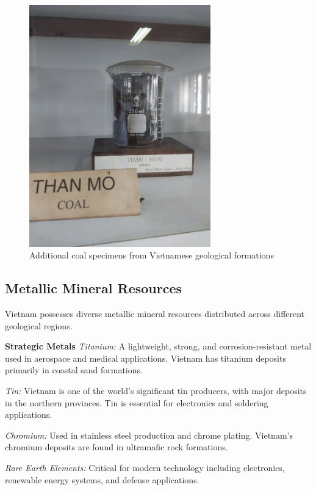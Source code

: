 \begin{figure}[H]
\centering
\includegraphics[width=0.7\textwidth]{graphics/coal_types_2.png}
\caption{Additional coal specimens from Vietnamese geological formations}
\label{fig:coal_specimens}
\end{figure}

\subsection{Metallic Mineral Resources}

Vietnam possesses diverse metallic mineral resources distributed across different geological regions.

\textbf{Strategic Metals}
\textit{Titanium:} A lightweight, strong, and corrosion-resistant metal used in aerospace and medical applications. Vietnam has titanium deposits primarily in coastal sand formations.

\textit{Tin:} Vietnam is one of the world's significant tin producers, with major deposits in the northern provinces. Tin is essential for electronics and soldering applications.

\textit{Chromium:} Used in stainless steel production and chrome plating. Vietnam's chromium deposits are found in ultramafic rock formations.

\textit{Rare Earth Elements:} Critical for modern technology including electronics, renewable energy systems, and defense applications.

